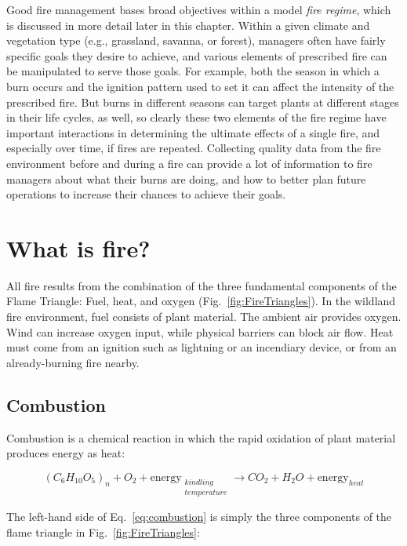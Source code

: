 Good fire management bases broad objectives within a model \emph{fire regime}, which is discussed in more detail later in this chapter. 
Within a given climate and vegetation type (e.g., grassland, savanna, or forest), managers often have fairly specific goals they desire to achieve, and various elements of prescribed fire can be manipulated to serve those goals. 
For example, both the season in which a burn occurs and the ignition pattern used to set it can affect the intensity of the prescribed fire. 
But burns in different seasons can target plants at different stages in their life cycles, as well, so clearly these two elements of the fire regime have important interactions in determining the ultimate effects of a single fire, and especially over time, if fires are repeated. 
Collecting quality data from the fire environment before and during a fire can provide a lot of information to fire managers about what their burns are doing, and how to better plan future operations to increase their chances to achieve their goals. 

\section{What is fire?}

All fire results from the combination of the three fundamental components of the Flame Triangle: Fuel, heat, and oxygen (Fig.~\ref{fig:FireTriangles}).
In the wildland fire environment, fuel consists of plant material. 
The ambient air provides oxygen.
Wind can increase oxygen input, while physical barriers can block air flow. 
Heat must come from an ignition such as lightning or an incendiary device, or from an already-burning fire nearby.

\subsection{Combustion} 

Combustion is a chemical reaction in which the rapid oxidation of plant material produces energy as heat:  

\begin{equation}\label{eq:combustion}
	(C_{6}H_{10}O_{5})_{n} + O_{2} + \text{energy}_{\substack{kindling\\temperature}} \rightarrow   CO_{2} + H_{2}O + \text{energy}_{heat}
\end{equation} 

The left-hand side of Eq.~\ref{eq:combustion} is simply the three components of the flame triangle in Fig.~\ref{fig:FireTriangles}: 


